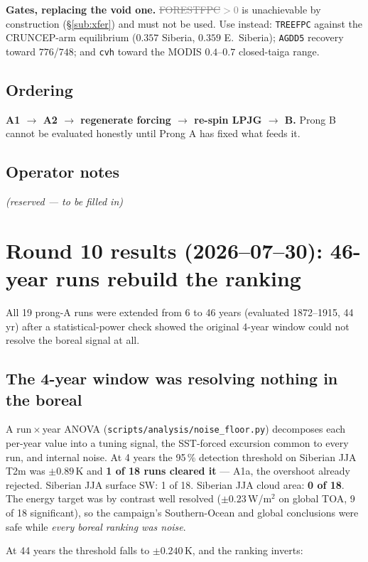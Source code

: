 \documentclass[10pt]{article}
\newcommand{\dead}[1]{\textcolor{gray}{\sout{#1}}}
\begin{document}
\textbf{Gates, replacing the void one.} \dead{FORESTFPC$>0$} is unachievable by construction
(\S\ref{sub:xfer}) and must not be used. Use instead: \texttt{TREEFPC} against the CRUNCEP-arm equilibrium
($0.357$ Siberia, $0.359$ E.\ Siberia); \texttt{AGDD5} recovery toward $776$/$748$; and \texttt{cvh} toward
the MODIS $0.4$--$0.7$ closed-taiga range.

\subsection{Ordering}
\textbf{A1 $\to$ A2 $\to$ regenerate forcing $\to$ re-spin LPJG $\to$ B.} Prong B cannot be evaluated honestly
until Prong A has fixed what feeds it.

\subsection{Operator notes}\label{sub:r10notes}
\emph{(reserved --- to be filled in)}

\section{Round 10 results (2026--07--30): 46-year runs rebuild the ranking}\label{sec:round10res}
All 19 prong-A runs were extended from 6 to 46 years (evaluated 1872--1915, 44\,yr) after a statistical-power
check showed the original 4-year window could not resolve the boreal signal at all.

\subsection{The 4-year window was resolving nothing in the boreal}\label{sub:noisefloor}
A run\,$\times$\,year ANOVA (\texttt{scripts/analysis/noise\_floor.py}) decomposes each per-year value into a
tuning signal, the SST-forced excursion common to every run, and internal noise. At 4 years the 95\,\% detection
threshold on Siberian JJA T2m was $\pm0.89$\,K and \textbf{1 of 18 runs cleared it} --- A1a, the overshoot already
rejected. Siberian JJA surface SW: 1 of 18. Siberian JJA cloud area: \textbf{0 of 18}. The energy target was by
contrast well resolved ($\pm0.23$\,W/m$^2$ on global TOA, 9 of 18 significant), so the campaign's Southern-Ocean
and global conclusions were safe while \emph{every boreal ranking was noise}.

At 44 years the threshold falls to $\pm\mathbf{0.240}$\,K, and the ranking inverts:
\end{document}
